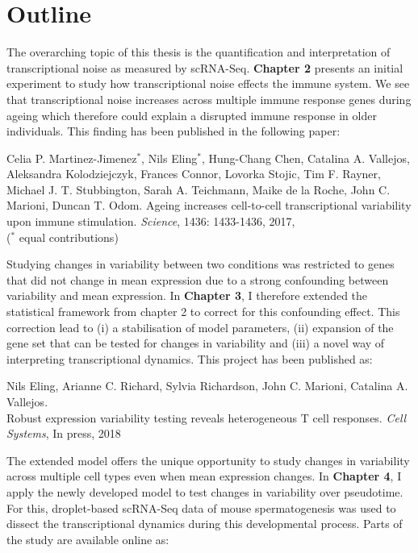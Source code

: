 

\section{Outline}

The overarching topic of this thesis is the quantification and interpretation of transcriptional noise as measured by scRNA-Seq. \textbf{Chapter 2} presents an initial experiment to study how  transcriptional noise effects the immune system. We see that transcriptional noise increases across multiple immune response genes during ageing which therefore could explain a disrupted immune response in older individuals. This finding has been published in the following paper:

\begin{Abstract}
\hspace{-5mm} Celia P. Martinez-Jimenez$^\ast$, Nils  Eling$^\ast$, Hung-Chang Chen, Catalina A. Vallejos, Aleksandra Kolodziejczyk, Frances Connor, Lovorka Stojic, Tim F. Rayner, Michael J. T. Stubbington, Sarah A. Teichmann, Maike de la Roche, John C. Marioni, Duncan T. Odom. Ageing increases cell-to-cell transcriptional variability upon immune stimulation. \emph{Science}, 1436: 1433-1436, 2017, \\
($^\ast$ equal contributions) 
\end{Abstract}

Studying changes in variability between two conditions was restricted to genes that did not change in mean expression due to a strong confounding between variability and mean expression. In \textbf{Chapter 3}, I therefore extended the statistical framework from chapter 2 to correct for this confounding effect. This correction lead to (i) a stabilisation of model parameters, (ii) expansion of the gene set that can be tested for changes in variability and (iii) a novel way of interpreting transcriptional dynamics. This project has been published as:

\begin{Abstract}
\hspace{-5mm} Nils Eling, Arianne C. Richard, Sylvia Richardson, John C. Marioni, Catalina A. Vallejos. \\
Robust expression variability testing reveals heterogeneous T cell responses. \emph{Cell Systems}, In press, 2018
\end{Abstract}

The extended model offers the unique opportunity to study changes in variability across multiple cell types even when mean expression changes. In \textbf{Chapter 4}, I apply the newly developed model to test changes in variability over pseudotime. For this, droplet-based scRNA-Seq data of mouse spermatogenesis was used to dissect the transcriptional dynamics during this developmental process. Parts of the study are available online as:

